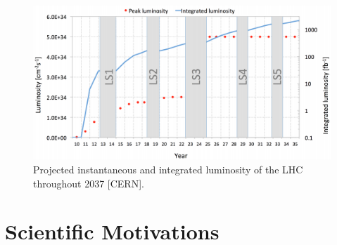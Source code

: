     \begin{figure}[h!]
      \centering
      \includegraphics[width=\textwidth]{img/I-2-LHC/lhc-schedule.png}
      \caption{Projected instantaneous and integrated luminosity of the LHC throughout 2037 [CERN].}
      \label{fig:I-2-luminosity}
    \end{figure}

  \section{Scientific Motivations}
